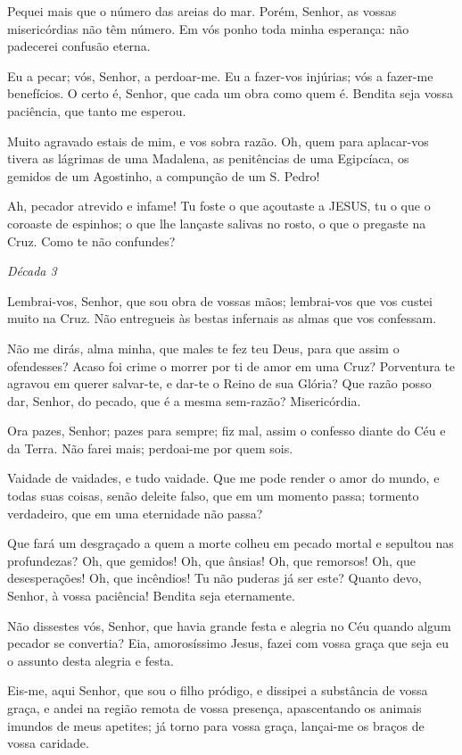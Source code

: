 Pequei mais que o número das areias do mar. Porém, Senhor, as vossas misericórdias não têm número. Em vós ponho toda minha esperança: não padecerei confusão eterna.

Eu a pecar; vós, Senhor, a perdoar-me. Eu a fazer-vos injúrias; vós a fazer-me benefícios. O certo é, Senhor, que cada um obra como quem é. Bendita seja vossa paciência, que tanto me esperou.

Muito agravado estais de mim, e vos sobra razão. Oh, quem para aplacar-vos tivera as lágrimas de uma Madalena, as penitências de uma Egipcíaca, os gemidos de um Agostinho, a compunção de um S. Pedro!

Ah, pecador atrevido e infame! Tu foste o que açoutaste a JESUS, tu o que o coroaste de espinhos; o que lhe lançaste salivas no rosto, o que o pregaste na Cruz. Como te não confundes?

\begin{nscenter} \emph{Década 3} \end{nscenter}

Lembrai-vos, Senhor, que sou obra de vossas mãos; lembrai-vos que vos custei muito na Cruz. Não entregueis às bestas infernais as almas que vos confessam.

Não me dirás, alma minha, que males te fez teu Deus, para que assim o ofendesses? Acaso foi crime o morrer por ti de amor em uma Cruz? Porventura te agravou em querer salvar-te, e dar-te o Reino de sua Glória? Que razão posso dar, Senhor, do pecado, que é a mesma sem-razão? Misericórdia.

Ora pazes, Senhor; pazes para sempre; fiz mal, assim o confesso diante do Céu e da Terra. Não farei mais; perdoai-me por quem sois.

Vaidade de vaidades, e tudo vaidade. Que me pode render o amor do mundo, e todas suas coisas, senão deleite falso, que em um momento passa; tormento verdadeiro, que em uma eternidade não passa?

Que fará um desgraçado a quem a morte colheu em pecado mortal e sepultou nas profundezas? Oh, que gemidos! Oh, que ânsias! Oh, que remorsos! Oh, que desesperações! Oh, que incêndios! Tu não puderas já ser este? Quanto devo, Senhor, à vossa paciência! Bendita seja eternamente.

Não dissestes vós, Senhor, que havia grande festa e alegria no Céu quando algum pecador se convertia? Eia, amorosíssimo Jesus, fazei com vossa graça que seja eu o assunto desta alegria e festa.

Eis-me, aqui Senhor, que sou o filho pródigo, e dissipei a substância de vossa graça, e andei na região remota de vossa presença, apascentando os animais imundos de meus apetites; já torno para vossa graça, lançai-me os braços de vossa caridade.

